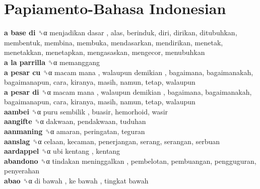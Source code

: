 \twocolumn
\chapter{Papiamento-Bahasa Indonesian}
\small
{}\textbf{a base di} ␝α   menjadikan dasar , alas, berinduk, diri, dirikan, ditubuhkan, membentuk, membina, membuka, mendasarkan, mendirikan, menetak, menetakkan, menetapkan, mengasaskan, mengecor, menubuhkan  \\
\textbf{a la parrilla} ␝α  memanggang  \\
\textbf{a pesar cu} ␝α   macam mana ,  walaupun demikian , bagaimana, bagaimanakah, bagaimanapun, cara, kiranya, masih, namun, tetap, walaupun  \\
\textbf{a pesar di} ␝α   macam mana ,  walaupun demikian , bagaimana, bagaimanakah, bagaimanapun, cara, kiranya, masih, namun, tetap, walaupun  \\
\textbf{aambei} ␝α   puru sembilik , buasir, hemorhoid, wasir  \\
\textbf{aangifte} ␝α  dakwaan, pendakwaan, tuduhan  \\
\textbf{aanmaning} ␝α  amaran, peringatan, teguran  \\
\textbf{aanslag} ␝α  celaan, kecaman, penerjangan, serang, serangan, serbuan  \\
\textbf{aardappel} ␝α   ubi kentang , kentang  \\
\textbf{abandono} ␝α   tindakan meninggalkan , pembelotan, pembuangan, pengguguran, penyerahan  \\
\textbf{abao} ␝α   di bawah ,  ke bawah ,  tingkat bawah   \\
